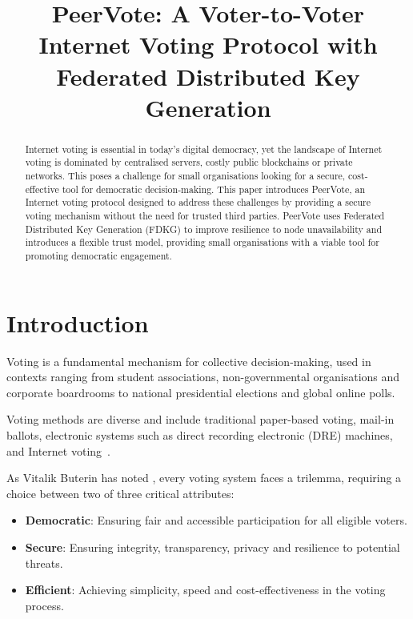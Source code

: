 \documentclass[runningheads]{llncs}
\begin{document}
\title{PeerVote: A Voter-to-Voter Internet Voting Protocol with Federated Distributed Key Generation}


\maketitle

\begin{abstract}
Internet voting is essential in today's digital democracy, yet the landscape of Internet voting is dominated by centralised servers, costly public blockchains or private networks.
This poses a challenge for small organisations looking for a secure, cost-effective tool for democratic decision-making. 
This paper introduces PeerVote, an Internet voting protocol designed to address these challenges by providing a secure voting mechanism without the need for trusted third parties. 
PeerVote uses Federated Distributed Key Generation (FDKG) to improve resilience to node unavailability and introduces a flexible trust model, providing small organisations with a viable tool for promoting democratic engagement.

\end{abstract}

\section{Introduction}

Voting is a fundamental mechanism for collective decision-making, used in contexts ranging from student associations, non-governmental organisations and corporate boardrooms to national presidential elections and global online polls.

Voting methods are diverse and include traditional paper-based voting, mail-in ballots, electronic systems such as direct recording electronic (DRE) machines, and Internet voting~\cite{parkGoingBadWorse2021}.

As Vitalik Buterin has noted \cite{buterinBlockchainVotingOverrated2021}, every voting system faces a trilemma, requiring a choice between two of three critical attributes:

\begin{itemize}
\item \textbf{Democratic}: Ensuring fair and accessible participation for all eligible voters.
\item \textbf{Secure}: Ensuring integrity, transparency, privacy and resilience to potential threats.
\item \textbf{Efficient}: Achieving simplicity, speed and cost-effectiveness in the voting process.
\end{itemize}
\end{document}
